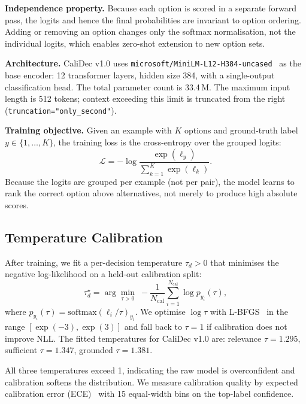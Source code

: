 \documentclass[twocolumn]{ICCKjournal}
\newcommand{\logit}{\ell}
\begin{document}
\textbf{Independence property.} Because each option is scored in a separate forward pass, the logits and hence the final probabilities are invariant to option ordering. Adding or removing an option changes only the softmax normalisation, not the individual logits, which enables zero-shot extension to new option sets.

\textbf{Architecture.} CaliDec v1.0 uses \texttt{microsoft/MiniLM-L12-H384-uncased}~\cite{wang2020minilm} as the base encoder: 12 transformer layers, hidden size 384, with a single-output classification head. The total parameter count is 33.4\,M. The maximum input length is 512 tokens; context exceeding this limit is truncated from the right (\texttt{truncation="only\_second"}).

\textbf{Training objective.} Given an example with $K$ options and ground-truth label $y \in \{1, \dots, K\}$, the training loss is the cross-entropy over the grouped logits:
\begin{equation}
    \mathcal{L} = -\log \frac{\exp(\logit_y)}{\sum_{k=1}^{K} \exp(\logit_k)}.
    \label{eq:loss}
\end{equation}
Because the logits are grouped per example (not per pair), the model learns to rank the correct option above alternatives, not merely to produce high absolute scores.

\subsection{Temperature Calibration}
\label{sec:calibration}
After training, we fit a per-decision temperature $\tau_d > 0$ that minimises the negative log-likelihood on a held-out calibration split:
\begin{equation}
    \tau_d^\star = \arg\min_{\tau > 0}\; -\frac{1}{N_{\mathrm{cal}}} \sum_{i=1}^{N_{\mathrm{cal}}} \log p_{y_i}(\tau),
    \label{eq:tempfit}
\end{equation}
where $p_{y_i}(\tau) = \mathrm{softmax}(\boldsymbol\logit_i / \tau)_{y_i}$. We optimise $\log\tau$ with L-BFGS~\cite{liu1989lbfgs} in the range $[\exp(-3), \exp(3)]$ and fall back to $\tau=1$ if calibration does not improve NLL. The fitted temperatures for CaliDec v1.0 are: relevance $\tau = 1.295$, sufficient $\tau = 1.347$, grounded $\tau = 1.381$.

All three temperatures exceed 1, indicating the raw model is overconfident and calibration softens the distribution. We measure calibration quality by expected calibration error (ECE)~\cite{naeini2015ece} with 15 equal-width bins on the top-label confidence.
\end{document}
